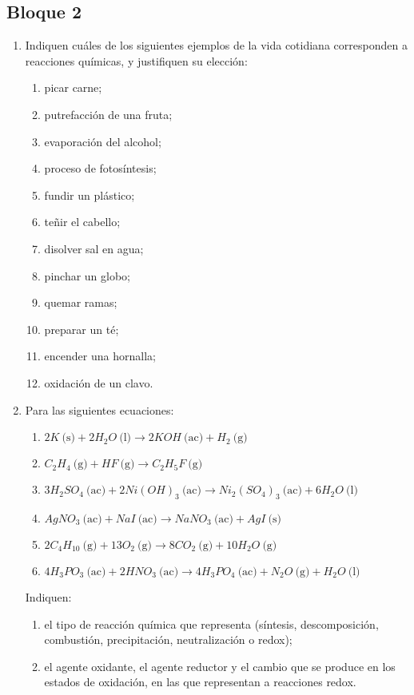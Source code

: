 \documentclass[../Práctica.root.tex]{subfiles}
\newcommand{\lra}{\ensuremath{\longrightarrow{}}}
\newcommand{\eac}{\ \text{(ac)}}
\newcommand{\es}{\ \text{(s)}}
\newcommand{\el}{\ \text{(l)}}
\newcommand{\eg}{\ \text{(g)}}
\begin{document}
\subsection{Bloque 2}
\begin{enumerate}
    \item Indiquen cuáles de los siguientes ejemplos de la vida cotidiana corresponden a reacciones
          químicas, y justifiquen su elección:
          \begin{enumerate}
              \item picar carne;
              \item putrefacción de una fruta;
              \item evaporación del alcohol;
              \item proceso de fotosíntesis;
              \item fundir un plástico;
              \item teñir el cabello;
              \item disolver sal en agua;
              \item pinchar un globo;
              \item quemar ramas;
              \item preparar un té;
              \item encender una hornalla;
              \item oxidación de un clavo.
          \end{enumerate}

    \item Para las siguientes ecuaciones:
          \begin{enumerate}
              \item $2 K \es + 2 H_2O \el \lra 2 KOH \eac + H_2 \eg$
              \item $C_2H_4 \eg + HF \eg \lra C_2H_5F \eg$
              \item $3 H_2SO_4 \eac + 2 Ni(OH)_3 \eac \lra Ni_2(SO_4)_3 \eac + 6 H_2O \el$
              \item $AgNO_3 \eac + NaI \eac \lra NaNO_3 \eac + AgI \es$
              \item $2 C_4H_{10} \eg + 13 O_2 \eg \lra 8 CO_2 \eg + 10 H_2O \eg$
              \item $4 H_3PO_3 \eac + 2 HNO_3 \eac \lra 4 H_3PO_4 \eac + N_2O \eg + H_2O \el$
          \end{enumerate}
          Indiquen:
          \begin{enumerate}
              \item el tipo de reacción química que representa (síntesis, descomposición, combustión,
                    precipitación, neutralización o redox);
              \item el agente oxidante, el agente reductor y el cambio que se produce en los estados de
                    oxidación, en las que representan a reacciones redox.
          \end{enumerate}


\end{enumerate}
\end{document}
